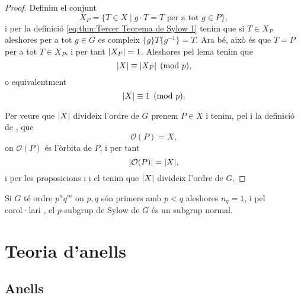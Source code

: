 \documentclass[../Apunts.tex]{subfiles}
\begin{document}
\begin{theorem}
\begin{proof}
			Definim el conjunt
			\[X_{P}=\{T\in X\mid g\cdot T=T\text{ per a tot }g\in P\},\]
			i per la definició \eqref{eq:thm:Tercer Teorema de Sylow 1} tenim que si \(T\in X_{P}\) aleshores per a tot \(g\in G\) es compleix \(\{g\}T\{g^{-1}\}=T\). Ara bé, això és que \(T=P\) per a tot \(T\in X_{P}\), i per tant \(\abs{X_{P}}=1\). Aleshores pel lema  tenim que
			\[\abs{X}\equiv\abs{X_{P}}\pmod{p},\]
			o equivalentment
			\[\abs{X}\equiv1\pmod{p}.\]
			
			Per veure que \(\abs{X}\) divideix l'ordre de \(G\) prenem \(P\in X\) i tenim, pel  i la definició de , que
			\[\mathcal{O}(P)=X,\]
			on \(\mathcal{O}(P)\) és l'òrbita de \(P\), i per tant
			\[\abs{\mathcal{O}(P)}=\abs{X},\]
			i per les proposicions  i  i el  tenim que \(\abs{X}\) divideix l'ordre de \(G\).
		\end{proof}
	\end{theorem}
	\begin{corollary}
		Si \(G\) té ordre \(p^{n}q^{m}\) on \(p,q\) són primers amb \(p<q\) aleshores \(n_{q}=1\), i pel corol·lari , el \(p\)-subgrup de Sylow de \(G\) és un subgrup normal.
	\end{corollary}
\chapter{Teoria d'anells}
	\section{Anells}
\end{document}
